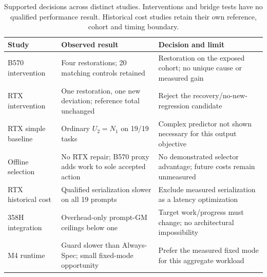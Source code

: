 \begin{table}[t]
\centering
\caption{Supported decisions across distinct studies. Interventions and bridge tests have no qualified performance result. Historical cost studies retain their own reference, cohort and timing boundary.}
\label{tab:decisions}
\begin{tabular}{@{}>{\raggedright\arraybackslash}p{1.1in}>{\raggedright\arraybackslash}p{2.5in}>{\raggedright\arraybackslash}p{2.80in}@{}}
\toprule
Study & Observed result & Decision and limit \\
\midrule
B570 intervention & Four restorations; 20 matching controls retained & Restoration on the exposed cohort; no unique cause or measured gain \\
RTX intervention & One restoration, one new deviation; reference total unchanged & Reject the recovery/no-new-regression candidate \\
RTX simple baseline & Ordinary $U_2=N_1$ on 19/19 tasks & Complex predictor not shown necessary for this output objective \\
Offline selection & No RTX repair; B570 proxy adds work to sole accepted action & No demonstrated selector advantage; future costs remain unmeasured \\
RTX historical cost & Qualified serialization slower on all 19 prompts & Exclude measured serialization as a latency optimization \\
358H integration & Overhead-only prompt-GM ceilings below one & Target work/progress must change; no architectural impossibility \\
M4 runtime & Guard slower than Always-Spec; small fixed-mode opportunity & Prefer the measured fixed mode for this aggregate workload \\
\bottomrule
\end{tabular}
\end{table}
